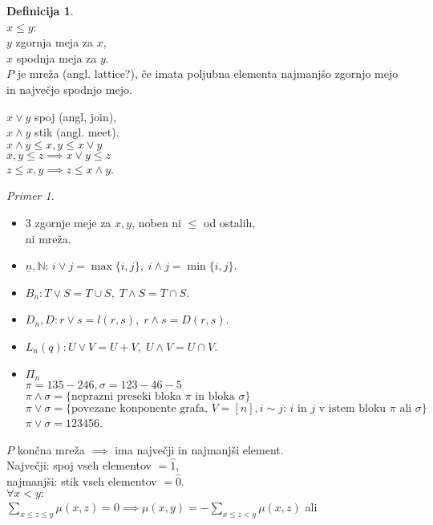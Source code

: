 \documentclass[a4paper, 12pt]{book}
\theoremstyle{definition}
\newtheorem{defn}[counter]{Definicija}
\theoremstyle{remark}
\newtheorem*{ex}{Primer}
\newcommand{\N}{\mathbb{N}}
\begin{document}
\begin{defn} \text{} \\
  $x \leq y$: \\
  $y$ zgornja meja za $x$, \\
  $x$ spodnja meja za $y$. \\
  $P$ je mreža (angl. lattice?), če imata poljubna elementa najmanjšo zgornjo mejo in največjo spodnjo mejo.
\end{defn}
$x \lor y$ spoj (angl, join), \\
$x \land y$ stik (angl. meet). \\
$x \land y \leq x, y \leq x \lor y$ \\
$x, y \leq z \implies x \lor y \leq z$ \\
$z \leq x, y \implies z \leq x \land y$.
\begin{ex} \text{} \\
  \begin{itemize}
    \item 3 zgornje meje za $x, y$, noben ni $\leq$ od ostalih, \\
      ni mreža.
    \item $\underline{n}, \N$: $i \lor j = \max \{i, j\}, \; i \land j = \min \{i, j\}$.
    \item $B_n: T \lor S = T \cup S, \; T \land S = T \cap S$.
    \item $D_n, D: r \lor s = l(r, s), \; r \land s = D(r, s)$.
    \item $L_n(q): U \lor V = U + V, \; U \land V = U \cap V$.
    \item $\Pi_n$ \\
      $\pi = 135-246, \sigma = 123-46-5$ \\
      $\pi \land \sigma = \{\text{neprazni preseki bloka $\pi$ in bloka $\sigma$}\}$ \\
      $\pi \lor \sigma = \{\text{povezane konponente grafa, $V = [n], i \sim j$:
        $i$ in $j$ v istem bloku $\pi$ ali $\sigma$}\}$
      $\pi \lor \sigma = 123456$.
  \end{itemize}
\end{ex}
$P$ končna mreža $\implies$ ima največji in najmanjši element. \\
Največji: spoj vseh elementov $= \hat{1}$, \\
najmanjši: stik vseh elementov $= \hat{0}$. \\
$\forall x < y:$ \\
$\sum_{x \leq z \leq y} \mu(x, z) = 0 \implies \mu(x, y) = - \sum_{x \leq z < y} \mu(x, z)$ ali \\
\end{document}
